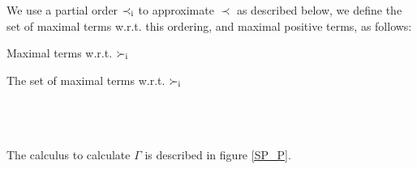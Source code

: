 We use a partial order $\prec_{\mathrm{i}}$ to approximate $\prec$ as described below, we define the set of maximal terms w.r.t. this ordering, and maximal positive terms, as follows:
\begin{definition}{Maximal terms w.r.t. $\succ_{\mathrm{i}}$}

\noindent
The set of maximal terms w.r.t. $\succ_{\mathrm{i}}$\\
\\
\\
\\

\label{def_maxTermsi}
\end{definition}

\noindent
The calculus to calculate $\Gamma$ is described in figure \ref{SP_P}.

